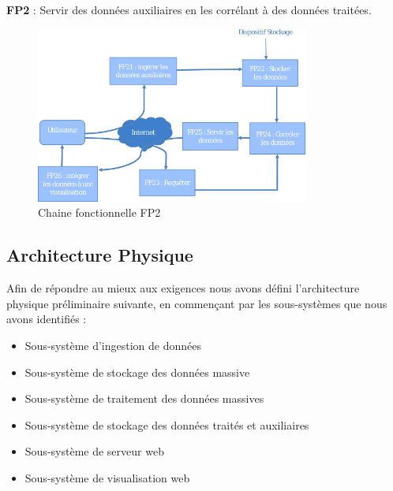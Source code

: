 \documentclass[a4paper]{article}
\begin{document}
\textbf{FP2} : Servir des données auxiliaires en les corrélant à des données traitées.

\begin{figure}[h]
\centering
	\includegraphics[width=0.8\textwidth]{./tmp/ChaineFonct2.png}
	\caption{Chaine fonctionnelle FP2}
\end{figure}

\newpage
\subsection{Architecture Physique}

Afin de répondre au mieux aux exigences nous avons défini l’architecture physique
préliminaire suivante, en commençant par les sous-systèmes que nous avons identifiés :

\begin{itemize}

\item Sous-système d’ingestion de données

\item Sous-système de stockage des données massive

\item Sous-système de traitement des données massives

\item Sous-système de stockage des données traités et auxiliaires

\item Sous-système de serveur web

\item Sous-système de visualisation web

\end{itemize}
\end{document}
